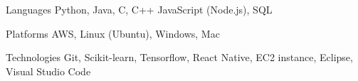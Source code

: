 \begin{cvskills}

\cvskill
    {Languages}
    {Python, Java, C, C++ JavaScript (Node.js), SQL}

\cvskill
    {Platforms}
    {AWS, Linux (Ubuntu), Windows, Mac}

\cvskill
    {Technologies}
    {Git, Scikit-learn, Tensorflow, React Native, EC2 instance, Eclipse, Visual Studio Code}

\end{cvskills}
